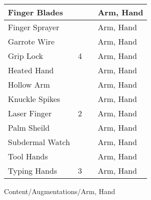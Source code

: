 \documentclass[twoside]{book}
\begin{document}
\begin{longtable}{p{1.25in}p{2em}ll}
  \raggedright
           Finger Blades 
  &
  
  &
  
  &
   Arm, Hand 
  \tabularnewline
  \hline
      
  \raggedright
           Finger Sprayer 
  &
  
  &
  
  &
   Arm, Hand 
  \tabularnewline
  \hline
      
  \raggedright
           Garrote Wire 
  &
  
  &
  
  &
   Arm, Hand 
  \tabularnewline
  \hline
      
  \raggedright
           Grip Lock 
  &
   4 
  &
  
  &
   Arm, Hand 
  \tabularnewline
  \hline
      
  \raggedright
           Heated Hand 
  &
  
  &
  
  &
   Arm, Hand 
  \tabularnewline
  \hline
      
  \raggedright
           Hollow Arm 
  &
  
  &
  
  &
   Arm, Hand 
  \tabularnewline
  \hline
      
  \raggedright
           Knuckle Spikes 
  &
  
  &
  
  &
   Arm, Hand 
  \tabularnewline
  \hline
      
  \raggedright
           Laser Finger 
  &
   2 
  &
  
  &
   Arm, Hand 
  \tabularnewline
  \hline
      
  \raggedright
           Palm Sheild 
  &
  
  &
  
  &
   Arm, Hand 
  \tabularnewline
  \hline
      
  \raggedright
           Subdermal Watch 
  &
  
  &
  
  &
   Arm, Hand 
  \tabularnewline
  \hline
      
  \raggedright
           Tool Hands 
  &
  
  &
  
  &
   Arm, Hand 
  \tabularnewline
  \hline
      
  \raggedright
           Typing Hands 
  &
   3 
  &
  
  &
   Arm, Hand 
  \tabularnewline
  \hline
      
\end{longtable}
    Content/Augmentations/Arm, Hand
\hspace{-2ex}
\end{document}
